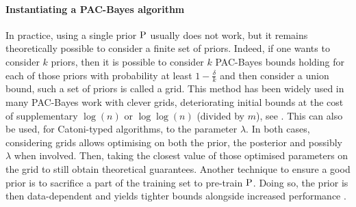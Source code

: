 \paragraph{Instantiating a PAC-Bayes algorithm}
  In practice, using a single prior $\P$ usually does not work, but it remains theoretically possible to consider a finite set of priors. Indeed, if one wants to consider $k$ priors, then it is possible to consider $k$ PAC-Bayes bounds holding for each of those priors with probability at least $1-\frac{\delta}{k}$ and then consider a union bound, such a set of priors is called a grid. This method has been widely used in many PAC-Bayes work with clever grids, deteriorating initial bounds at the cost of supplementary $\log(n)$ or $\log\log(n)$ (divided by $m$), see \eg \citet{alquier2024user}. 
  This can also be used, for Catoni-typed algorithms, to the parameter $\lambda$. In both cases, considering grids allows optimising on both the prior, the posterior and possibly $\lambda$ when involved. Then, taking the closest value of those optimised parameters on the grid to still obtain theoretical guarantees. Another technique to ensure a good prior is to sacrifice a part of the training set to pre-train $\P$. 
  Doing so, the prior is then data-dependent and yields tighter bounds alongside increased performance \citep{perez2021tighter,perezortiz2021learning}.

